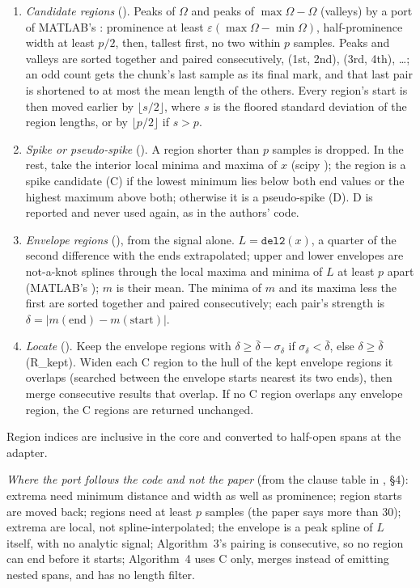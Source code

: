\begin{enumerate}
\item[B] \emph{Candidate regions} (). Peaks of $\Omega$ and peaks of
  $\max\Omega - \Omega$ (valleys) by a port of MATLAB's : prominence at least
  $\varepsilon(\max\Omega - \min\Omega)$, half-prominence width at least $p/2$, then, tallest
  first, no two within $p$ samples. Peaks and valleys are sorted together and paired
  consecutively, (1st, 2nd), (3rd, 4th), \dots; an odd count gets the chunk's last sample as
  its final mark, and that last pair is shortened to at most the mean length of the others.
  Every region's start is then moved earlier by $\lfloor s/2\rfloor$, where $s$ is the
  floored standard deviation of the region lengths, or by $\lfloor p/2\rfloor$ if $s > p$.
\item[C/D] \emph{Spike or pseudo-spike} (). A region shorter than $p$
  samples is dropped. In the rest, take the interior local minima and maxima of $x$ (scipy
  ); the region is a spike candidate (C) if the lowest minimum lies below
  both end values or the highest maximum above both; otherwise it is a pseudo-spike (D).
  D is reported and never used again, as in the authors' code.
\item[R] \emph{Envelope regions} (), from the signal alone. $L =
  \mathtt{del2}(x)$, a quarter of the second difference with the ends extrapolated; upper and
  lower envelopes are not-a-knot splines through the local maxima and minima of $L$ at least
  $p$ apart (MATLAB's ); $m$ is their mean. The minima of $m$ and
  its maxima less the first are sorted together and paired consecutively; each pair's strength
  is $\delta = |m(\mathrm{end}) - m(\mathrm{start})|$.
\item[S] \emph{Locate} (). Keep the envelope regions with $\delta \ge
  \bar\delta - \sigma_\delta$ if $\sigma_\delta < \bar\delta$, else $\delta \ge \bar\delta$
  (R\_kept). Widen each C region to the hull of the kept envelope regions it overlaps (searched
  between the envelope starts nearest its two ends), then merge consecutive results that
  overlap. If no C region overlaps any envelope region, the C regions are returned unchanged.
\end{enumerate}
Region indices are inclusive in the core and converted to half-open spans at the adapter.

\emph{Where the port follows the code and not the paper} (from the clause table in
, \S4): extrema need minimum
distance and width as well as prominence; region starts are moved back; regions need at least
$p$ samples (the paper says more than 30); extrema are local, not spline-interpolated; the
envelope is a peak spline of $L$ itself, with no analytic signal; Algorithm~3's pairing is
consecutive, so no region can end before it starts; Algorithm~4 uses C only, merges instead
of emitting nested spans, and has no length filter.


